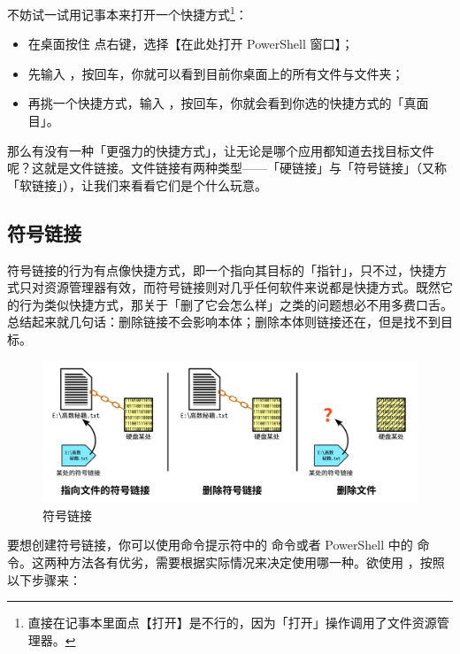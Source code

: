 {{{不妨试一试用记事本来打开一个快捷方式\footnote{直接在记事本里面点【打开】是不行的，因为「打开」操作调用了文件资源管理器。}：

\begin{itemize}
  \item 在桌面按住  点右键，选择【在此处打开 PowerShell 窗口】；
  \item 先输入 ，按回车，你就可以看到目前你桌面上的所有文件与文件夹；
  \item 再挑一个快捷方式，输入 ，按回车，你就会看到你选的快捷方式的「真面目」。
\end{itemize}

那么有没有一种「更强力的快捷方式」，让无论是哪个应用都知道去找目标文件呢？这就是文件链接。文件链接有两种类型——「硬链接」与「符号链接」（又称「软链接」），让我们来看看它们是个什么玩意。

\subsection{符号链接}

符号链接的行为有点像快捷方式，即一个指向其目标的「指针」，只不过，快捷方式只对资源管理器有效，而符号链接则对几乎任何软件来说都是快捷方式。既然它的行为类似快捷方式，那关于「删了它会怎么样」之类的问题想必不用多费口舌。总结起来就几句话：删除链接不会影响本体；删除本体则链接还在，但是找不到目标。

\begin{figure}[htb!]
  \centering
  \includegraphics[width=.8\textwidth]{assets/advanced/Symbolic_Link.pdf}
  \caption{符号链接}
  \label{fig:Symbolic_Link}
\end{figure}

要想创建符号链接，你可以使用命令提示符中的  命令或者 PowerShell 中的  命令。这两种方法各有优劣，需要根据实际情况来决定使用哪一种。欲使用 ，按照以下步骤来：


}}}

